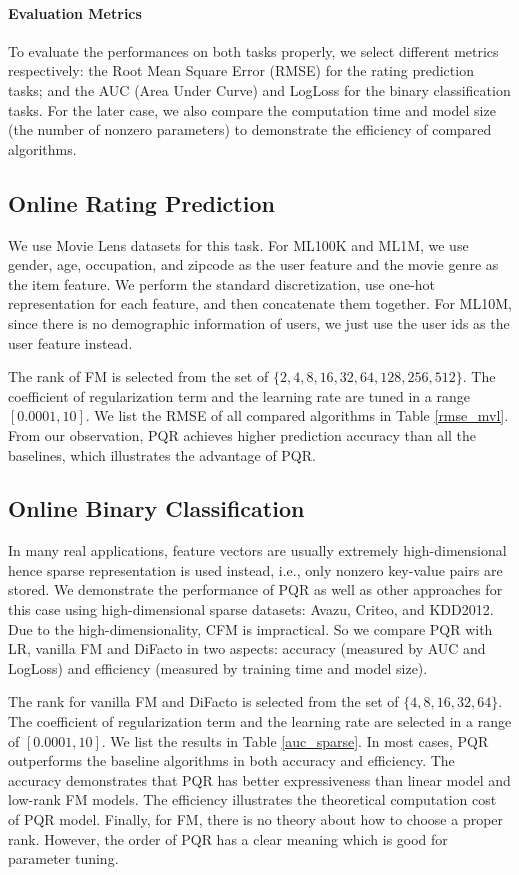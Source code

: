 \documentclass[letterpaper]{article} %
\theoremstyle{plain}
\theoremstyle{definition}
\begin{document}
\paragraph{Evaluation Metrics} To evaluate the performances on both tasks properly, we select different metrics respectively: the Root Mean Square Error (RMSE) for the rating prediction tasks; and the AUC (Area Under Curve) and LogLoss for the binary classification tasks. For the later case, we also compare the computation time and model size (the number of nonzero parameters) to demonstrate the efficiency of compared algorithms.

\subsection{Online Rating Prediction}

We use Movie Lens datasets for this task. For ML100K and ML1M, we use gender, age, occupation, and zipcode as the user feature and the movie genre as the item feature. We perform the standard discretization, use one-hot representation for each feature, and then concatenate them together. For ML10M, since there is no demographic information of users, we just use the user ids as the user feature instead.

The rank of FM is selected from the set of $\{2, 4, 8, 16, 32, 64, 128, 256, 512\}$. The coefficient of regularization term and the learning rate are tuned in a range $[0.0001, 10]$. We list the RMSE of all compared algorithms in Table \ref{rmse_mvl}. From our observation, PQR achieves higher prediction accuracy than all the baselines, which illustrates the advantage of PQR.

\subsection{Online Binary Classification}

In many real applications, feature vectors are usually extremely high-dimensional hence sparse representation is used instead, i.e., only nonzero key-value pairs are stored. We demonstrate the performance of PQR as well as other approaches for this case using high-dimensional sparse datasets: Avazu, Criteo, and KDD2012. Due to the high-dimensionality, CFM is impractical. So we compare PQR with LR, vanilla FM and DiFacto in two aspects: accuracy (measured by AUC and LogLoss) and efficiency (measured by training time and model size).

The rank for vanilla FM and DiFacto is selected from the set of $\{4, 8, 16, 32, 64\}$. The coefficient of regularization term and the learning rate are selected in a range of $[0.0001, 10]$. We list the results in Table \ref{auc_sparse}. In most cases, PQR outperforms the baseline algorithms in both accuracy and efficiency. The accuracy demonstrates that PQR has better expressiveness than linear model and low-rank FM models. The efficiency illustrates the theoretical computation cost of PQR model. Finally, for FM, there is no theory about how to choose a proper rank. However, the order of PQR has a clear meaning which is good for parameter tuning.
\end{document}

